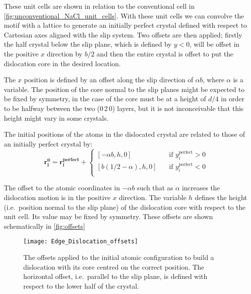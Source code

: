 These unit cells are shown in relation to the conventional cell in \autoref{fig:unconventional_NaCl_unit_cells}. With these unit cells we can convolve the motif with a lattice to generate an initially perfect crystal defined with respect to Cartesian axes aligned with the slip system. Two offsets are then applied; firstly the half crystal below the slip plane, which is defined by $y < 0$, will be offset in the positive $x$ direction by $b/2$ and then the entire crystal is offset to put the dislocation core in the desired location. 

The $x$ position is defined by an offset along the slip direction
of $\alpha b$, where $\alpha$ is a variable. The position of the core normal to the slip planes might be expected to be fixed by symmetry, in the case of  the core must be at a height of $d/4$ in order to be halfway between the two (0\,2\,0) layers, but it is not inconceivable that this height might vary in some crystals.

The initial positions of the atoms in the dislocated crystal are related to those of an initially perfect crystal by:
\begin{equation}
\bm{r_i^0} = \bm{r_i^{\text{perfect}}} +\begin{cases}
[-\alpha{}b, h, 0] & \quad \text{if } y_i^{\text{perfect}} > 0\\
[b(1/2 - \alpha{}), h, 0] & \quad \text{if } y_i^{\text{perfect}} < 0\\
\end{cases} 
\end{equation}

The offset to the atomic coordinates in $-\alpha{}b$ such that as $\alpha$ increases the dislocation motion is in the positive $x$ direction. The variable $h$ defines the height (i.e.\ position normal to the slip plane) of the dislocation core with respect to the unit cell. Its value may be fixed by symmetry. These offsets are shown schematically in \autoref{fig:offsets}

\begin{figure}
\centering\texttt{[image: Edge\_Dislocation\_offsets]}
\caption[Schematic showing the offsets applied to position the dislocation core.]{The offsets applied to the initial atomic configuration to build a dislocation with its core centred on the correct position. The horizontal offset, i.e.\ parallel to the slip plane, is defined with respect to the lower half of the crystal. \label{fig:offsets}}
\end{figure}



